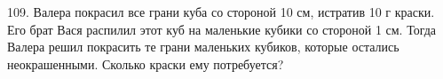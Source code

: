 109. Валера покрасил все грани куба со стороной 10 см, истратив 10 г краски. Его брат Вася распилил этот куб на маленькие кубики со стороной 1 см. Тогда Валера решил покрасить те грани маленьких кубиков, которые остались неокрашенными. Сколько краски ему потребуется?\\
